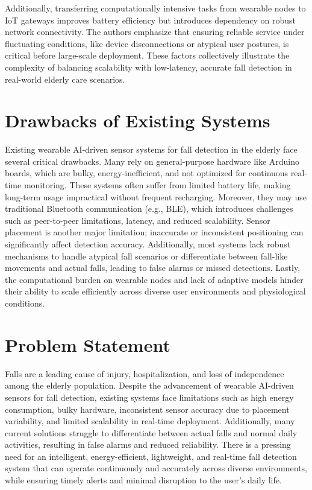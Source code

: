 \documentclass[a4paper, 12pt]{report}
\begin{document}
Additionally, transferring computationally intensive tasks from wearable nodes to IoT gateways improves battery efficiency but introduces dependency on robust network connectivity. The authors emphasize that ensuring reliable service under fluctuating conditions, like device disconnections or atypical user postures, is critical before large-scale deployment. These factors collectively illustrate the complexity of balancing scalability with low-latency, accurate fall detection in real-world elderly care scenarios.

\section{Drawbacks of Existing Systems}
Existing wearable AI-driven sensor systems for fall detection in the elderly face several critical drawbacks. Many rely on general-purpose hardware like Arduino boards, which are bulky, energy-inefficient, and not optimized for continuous real-time monitoring. These systems often suffer from limited battery life, making long-term usage impractical without frequent recharging. Moreover, they may use traditional Bluetooth communication (e.g., BLE), which introduces challenges such as peer-to-peer limitations, latency, and reduced scalability. Sensor placement is another major limitation; inaccurate or inconsistent positioning can significantly affect detection accuracy. Additionally, most systems lack robust mechanisms to handle atypical fall scenarios or differentiate between fall-like movements and actual falls, leading to false alarms or missed detections. Lastly, the computational burden on wearable nodes and lack of adaptive models hinder their ability to scale efficiently across diverse user environments and physiological conditions.


\section{Problem Statement}

Falls are a leading cause of injury, hospitalization, and loss of independence among the elderly population. Despite the advancement of wearable AI-driven sensors for fall detection, existing systems face limitations such as high energy consumption, bulky hardware, inconsistent sensor accuracy due to placement variability, and limited scalability in real-time deployment. Additionally, many current solutions struggle to differentiate between actual falls and normal daily activities, resulting in false alarms and reduced reliability. There is a pressing need for an intelligent, energy-efficient, lightweight, and real-time fall detection system that can operate continuously and accurately across diverse environments, while ensuring timely alerts and minimal disruption to the user’s daily life.
\end{document}
